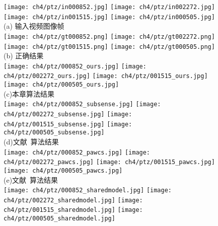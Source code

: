 \begin{figure}[htbp]
  \centering
  \texttt{[image: ch4/ptz/in000852.jpg]}
  \texttt{[image: ch4/ptz/in002272.jpg]}
  \texttt{[image: ch4/ptz/in001515.jpg]}
  \texttt{[image: ch4/ptz/in000505.jpg]}\\
  (a) 输入视频图像帧\\
  \texttt{[image: ch4/ptz/gt000852.png]}
  \texttt{[image: ch4/ptz/gt002272.png]}
  \texttt{[image: ch4/ptz/gt001515.png]}
  \texttt{[image: ch4/ptz/gt000505.png]}\\
  (b) 正确结果\\
  \texttt{[image: ch4/ptz/000852\_ours.jpg]}
  \texttt{[image: ch4/ptz/002272\_ours.jpg]}
  \texttt{[image: ch4/ptz/001515\_ours.jpg]}
  \texttt{[image: ch4/ptz/000505\_ours.jpg]}\\
  (c)本章算法结果\\
  \texttt{[image: ch4/ptz/000852\_subsense.jpg]}
  \texttt{[image: ch4/ptz/002272\_subsense.jpg]}
  \texttt{[image: ch4/ptz/001515\_subsense.jpg]}
  \texttt{[image: ch4/ptz/000505\_subsense.jpg]}\\
  (d)文献~算法结果\\
  \texttt{[image: ch4/ptz/000852\_pawcs.jpg]}
  \texttt{[image: ch4/ptz/002272\_pawcs.jpg]}
  \texttt{[image: ch4/ptz/001515\_pawcs.jpg]}
  \texttt{[image: ch4/ptz/000505\_pawcs.jpg]}\\
  (e)文献~算法结果\\
  \texttt{[image: ch4/ptz/000852\_sharedmodel.jpg]}
  \texttt{[image: ch4/ptz/002272\_sharedmodel.jpg]}
  \texttt{[image: ch4/ptz/001515\_sharedmodel.jpg]}
  \texttt{[image: ch4/ptz/000505\_sharedmodel.jpg]}\\

\end{figure}
